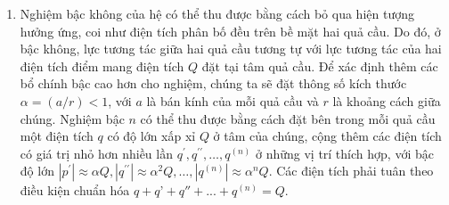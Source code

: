   \begin{loigiai}
\begin{enumerate}[1)]
   \item Nghiệm bậc không của hệ có thể thu được bằng cách bỏ qua hiện tượng hưởng ứng, coi như điện tích phân bố đều trên bề mặt hai quả cầu. Do đó, ở bậc không, lực tương tác giữa hai quả cầu tương tự với lực tương tác của hai điện tích điểm mang điện tích $Q$ đặt tại tâm quả cầu. Để xác định thêm các bổ chính bậc cao hơn cho nghiệm, chúng ta sẽ đặt thông số kích thước $\alpha = (a/r) <1$, với $a$ là bán kính của mỗi quả cầu và $r$ là khoảng cách giữa chúng. Nghiệm bậc $n$ có thể thu được bằng cách đặt bên trong mỗi quả cầu một điện tích $q$ có độ lớn xấp xỉ $Q$ ở tâm của chúng, cộng thêm các điện tích có giá trị nhỏ hơn nhiều lần $q^\prime, q^{\prime \prime}, …, q^{(n)}$ ở những vị trí thích hợp, với bậc độ lớn $ |p^\prime| \approx \alpha Q, |q^{\prime \prime}| \approx \alpha^2 Q, …, |q^{(n)}| \approx \alpha^n Q$. Các điện tích phải tuân theo điều kiện chuẩn hóa $q+q’+q''+...+q^{(n)}=Q$.\\
  \begin{center}



\begin{tikzpicture}[x=0.75pt,y=0.75pt,yscale=-1,xscale=1]


\end{tikzpicture}
\end{center}
\end{enumerate}
\end{loigiai}
